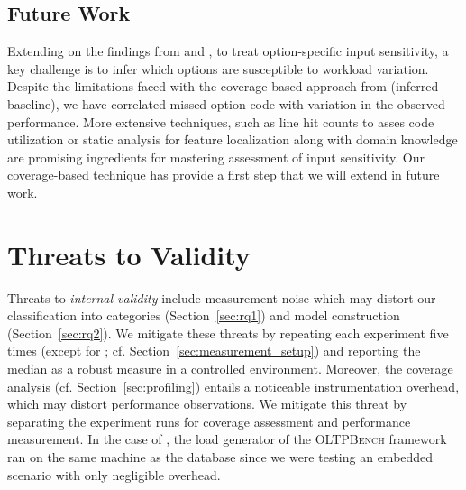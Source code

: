 {{{\subsection{Future Work}
Extending on the findings from  and , to treat
option-specific input sensitivity, a key challenge is to infer
which options are susceptible to workload variation. Despite the
limitations faced with the coverage-based approach from 
(inferred baseline), we have correlated missed option code with
variation in the observed performance. More extensive techniques, such as line hit counts to asses code utilization or static analysis for feature localization along with domain knowledge are promising ingredients
for mastering assessment of input sensitivity. Our coverage-based technique has provide a first step that we will extend in future work.


\section{Threats to Validity}\label{sec:threats}
Threats to \textit{internal validity} include measurement noise which may distort our classification into categories (Section~\ref{sec:rq1}) and model construction (Section~\ref{sec:rq2}). We mitigate these threats by repeating each experiment five times  (except for \htwo; cf. Section~\ref{sec:measurement_setup}) and reporting the median as a robust measure in a controlled environment. Moreover, the coverage analysis (cf. Section~\ref{sec:profiling}) entails a noticeable instrumentation overhead, which may distort performance observations. We mitigate this threat by separating the experiment runs for coverage assessment and performance measurement. In the case of \htwo, the load generator of the \textsc{OLTPBench} framework~\cite{difallah_oltp_2013} ran on the same machine as the database since we were testing an embedded scenario with only negligible overhead. 	
	
}}}
